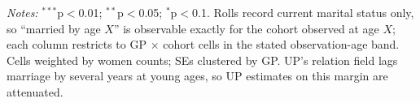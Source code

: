 \vspace{0.5ex}
\parbox{\linewidth}{\scriptsize \emph{Notes: } $^{***}$p$<$0.01; $^{**}$p$<$0.05; $^{*}$p$<$0.1. Rolls record current marital status only, so ``married by age $X$'' is observable exactly for the cohort observed at age $X$; each column restricts to GP $\times$ cohort cells in the stated observation-age band. Cells weighted by women counts; SEs clustered by GP. UP's relation field lags marriage by several years at young ages, so UP estimates on this margin are attenuated.}
